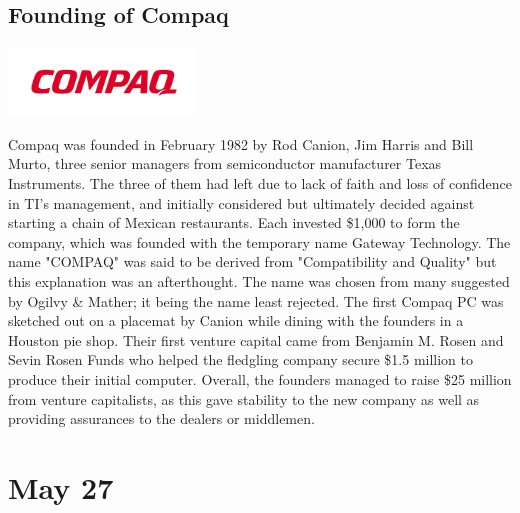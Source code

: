 \documentclass[11pt]{report}
\begin{document}
\subsection{Founding of Compaq}
\vspace{2mm}\begin{center}\includegraphics[width=5cm]{./img/compaqLogo.jpg}\end{center}
Compaq was founded in February 1982 by Rod Canion, Jim Harris and Bill Murto, three senior managers from semiconductor manufacturer Texas Instruments. The three of them had left due to lack of faith and loss of confidence in TI's management, and initially considered but ultimately decided against starting a chain of Mexican restaurants. Each invested \$1,000 to form the company, which was founded with the temporary name Gateway Technology. The name "COMPAQ" was said to be derived from "Compatibility and Quality" but this explanation was an afterthought. The name was chosen from many suggested by Ogilvy \& Mather; it being the name least rejected. The first Compaq PC was sketched out on a placemat by Canion while dining with the founders in a Houston pie shop. Their first venture capital came from Benjamin M. Rosen and Sevin Rosen Funds who helped the fledgling company secure \$1.5 million to produce their initial computer. Overall, the founders managed to raise \$25 million from venture capitalists, as this gave stability to the new company as well as providing assurances to the dealers or middlemen.
\section{May 27}
\end{document}
